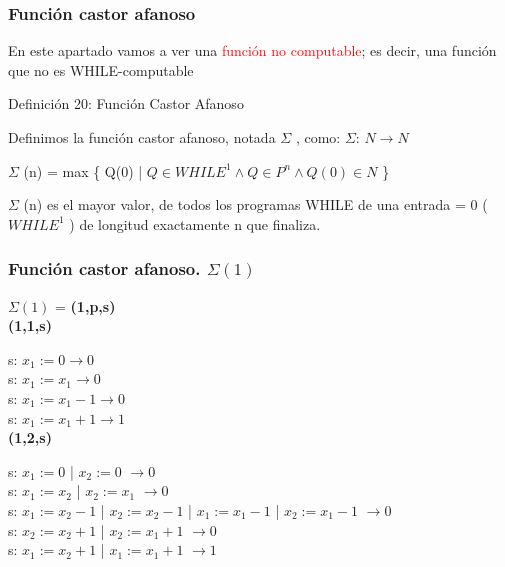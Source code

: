 \documentclass[xcolor=table]{beamer}
\begin{document}
\begin{frame}[fragile]\frametitle{Función castor afanoso} \scriptsize

En este apartado vamos a ver una \textcolor{red}{función no computable}; es decir, una función que no es WHILE-computable


\begin{block}{Definición 20:  Función Castor Afanoso}
\end{block}

Definimos la función castor afanoso, notada $\Sigma$ , como: $\Sigma$: $N \rightarrow N$

\begin{center}
    $\Sigma$ (n) = max \{ Q(0) | $Q\in WHILE^1 \wedge Q \in P^n \wedge Q(0) \in N$ \}
\end{center}


$\Sigma$ (n) es el mayor valor, de todos los programas WHILE de una entrada = 0 ( $WHILE^1$ ) de longitud exactamente n que finaliza.

\end{frame}

\begin{frame}[fragile]\frametitle{Función castor afanoso.  $\Sigma(1)$} \scriptsize


        $\Sigma(1)$ = \textbf{(1,p,s)}\\
        
       \textbf{ (1,1,s)}
        
        s: $x_1:= 0 \rightarrow 0$\\
        s: $x_1:= x_1 \rightarrow 0$\\
        s: $x_1:= x_1 -1 \rightarrow 0 $\\
        s: $x_1:= x_1 +1 \rightarrow 1$\\
        
       \textbf{ (1,2,s)}
        
        s: $x_1:= 0$   | $x_2:= 0$  $\rightarrow 0$\\
        s: $x_1:= x_2$ | $x_2:= x_1$ $\rightarrow 0$ \\
        s: $x_1:= x_2 -1$ | $x_2:= x_2 -1$ | $x_1:= x_1 -1$ | $x_2:= x_1 -1$  $\rightarrow 0$\\
        s: $x_2:= x_2 +1$ | $x_2:= x_1 +1$  $\rightarrow 0$\\
        s: $x_1:= x_2 +1$ | $x_1:= x_1 +1$  $\rightarrow 1$\\

\end{frame}
\end{document}
